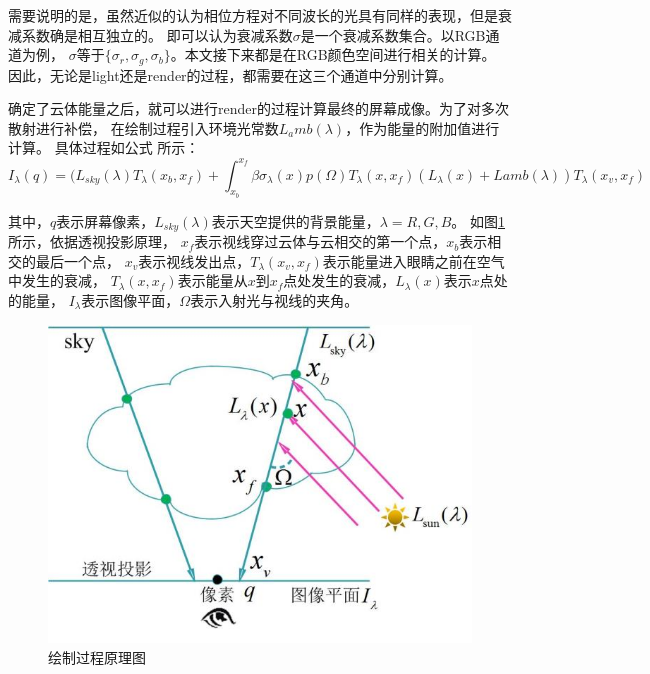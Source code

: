 需要说明的是，虽然近似的认为相位方程对不同波长的光具有同样的表现，但是衰减系数确是相互独立的。
即可以认为衰减系数$\sigma$是一个衰减系数集合。以RGB通道为例，
$\sigma$等于$\{\sigma_r,\sigma_g,\sigma_b\}$。本文接下来都是在RGB颜色空间进行相关的计算。
因此，无论是light还是render的过程，都需要在这三个通道中分别计算。

确定了云体能量之后，就可以进行render的过程计算最终的屏幕成像。为了对多次散射进行补偿，
在绘制过程引入环境光常数$L_amb(\lambda)$，作为能量的附加值进行计算。
具体过程如公式
所示：
\begin{equation}
\label{equ:multiple_scattering_compensation}
I_\lambda(q) = (L_{sky}(\lambda)T_\lambda(x_b,x_f)+
\int_{x_b}^{x_f}\beta\sigma_\lambda(x)p(\Omega)T_\lambda(x,x_f)(L_\lambda(x)+L{amb}(\lambda))
T_\lambda(x_v,x_f)
\end{equation}

其中，$q$表示屏幕像素，$L_{sky}(\lambda)$表示天空提供的背景能量，$\lambda{}={R,G,B}$。
如图\ref{fig:render_principle}所示，依据透视投影原理，
$x_f$表示视线穿过云体与云相交的第一个点，$x_b$表示相交的最后一个点，
 $x_v$表示视线发出点，$T_\lambda(x_v,x_f)$表示能量进入眼睛之前在空气中发生的衰减，
$T_\lambda(x,x_f)$表示能量从$x$到$x_f$点处发生的衰减，$L_\lambda(x)$表示$x$点处的能量，
$I_\lambda$表示图像平面，$\Omega$表示入射光与视线的夹角。

\begin{figure}
\centering
\includegraphics{figure/render_principle.jpg}
\caption{绘制过程原理图}
\label{fig:render_principle}
\end{figure}









